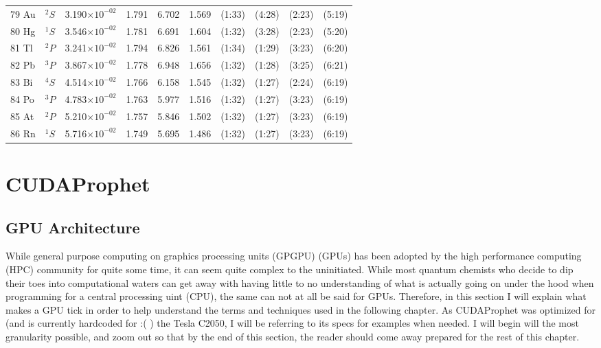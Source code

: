 \documentclass[12pt]{report}
\begin{document}
\begin{longtable}{l l r r r r r r r r}
79 Au & $^{2}S$ & 3.190$\times10^{-02}$ & 1.791 & 6.702 & 1.569 & (1:33) & (4:28) & (2:23) & (5:19) \\
80 Hg & $^{1}S$ & 3.546$\times10^{-02}$ & 1.781 & 6.691 & 1.604 & (1:32) & (3:28) & (2:23) & (5:20) \\
81 Tl & $^{2}P$ & 3.241$\times10^{-02}$ & 1.794 & 6.826 & 1.561 & (1:34) & (1:29) & (3:23) & (6:20) \\
82 Pb & $^{3}P$ & 3.867$\times10^{-02}$ & 1.778 & 6.948 & 1.656 & (1:32) & (1:28) & (3:25) & (6:21) \\
83 Bi & $^{4}S$ & 4.514$\times10^{-02}$ & 1.766 & 6.158 & 1.545 & (1:32) & (1:27) & (2:24) & (6:19) \\
84 Po & $^{3}P$ & 4.783$\times10^{-02}$ & 1.763 & 5.977 & 1.516 & (1:32) & (1:27) & (3:23) & (6:19) \\
85 At & $^{2}P$ & 5.210$\times10^{-02}$ & 1.757 & 5.846 & 1.502 & (1:32) & (1:27) & (3:23) & (6:19) \\
86 Rn & $^{1}S$ & 5.716$\times10^{-02}$ & 1.749 & 5.695 & 1.486 & (1:32) & (1:27) & (3:23) & (6:19) \\
\end{longtable}
\doublespacing

	
\chapter{CUDAProphet}
\section{GPU Architecture}
While general purpose computing on graphics processing units (GPGPU) (GPUs) has been adopted by the high performance computing (HPC) community for quite some time, it can seem quite complex to the uninitiated. While most quantum chemists who decide to dip their toes into computational waters can get away with having little to no understanding of what is actually going on under the hood when programming for a central processing uint (CPU), the same can not at all be said for GPUs. Therefore, in this section I will explain what makes a GPU tick in order to help understand the terms and techniques used in the following chapter. As CUDAProphet was optimized for (and is currently hardcoded for :( ) the Tesla C2050, I will be referring to its specs for examples when needed. I will begin will the most granularity possible, and zoom out so that by the end of this section, the reader should come away prepared for the rest of this chapter.
\end{document}
